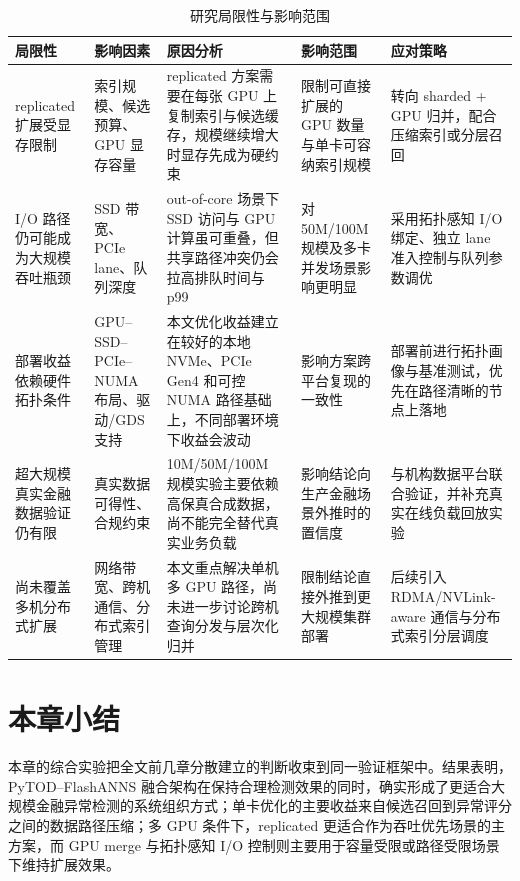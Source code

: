 \begin{table}[htbp]
  \caption{研究局限性与影响范围}
  \label{tab:limitations}
  \centering
  \footnotesize
  \setlength{\tabcolsep}{1.9pt}
  \renewcommand{\arraystretch}{1.18}
  \begin{adjustbox}{max width=\linewidth}
  \begin{tabular}{P{1.9cm}P{2.2cm}P{4.8cm}P{2.3cm}P{3.4cm}}
    \toprule
    局限性 & 影响因素 & 原因分析 & 影响范围 & 应对策略 \\
    \midrule
    replicated 扩展受显存限制 & 索引规模、候选预算、GPU 显存容量 & replicated 方案需要在每张 GPU 上复制索引与候选缓存，规模继续增大时显存先成为硬约束 & 限制可直接扩展的 GPU 数量与单卡可容纳索引规模 & 转向 sharded + GPU 归并，配合压缩索引或分层召回 \\
    I/O 路径仍可能成为大规模吞吐瓶颈 & SSD 带宽、PCIe lane、队列深度 & out-of-core 场景下 SSD 访问与 GPU 计算虽可重叠，但共享路径冲突仍会拉高排队时间与 p99 & 对 50M/100M 规模及多卡并发场景影响更明显 & 采用拓扑感知 I/O 绑定、独立 lane 准入控制与队列参数调优 \\
    部署收益依赖硬件拓扑条件 & GPU--SSD--PCIe--NUMA 布局、驱动/GDS 支持 & 本文优化收益建立在较好的本地 NVMe、PCIe Gen4 和可控 NUMA 路径基础上，不同部署环境下收益会波动 & 影响方案跨平台复现的一致性 & 部署前进行拓扑画像与基准测试，优先在路径清晰的节点上落地 \\
    超大规模真实金融数据验证仍有限 & 真实数据可得性、合规约束 & 10M/50M/100M 规模实验主要依赖高保真合成数据，尚不能完全替代真实业务负载 & 影响结论向生产金融场景外推时的置信度 & 与机构数据平台联合验证，并补充真实在线负载回放实验 \\
    尚未覆盖多机分布式扩展 & 网络带宽、跨机通信、分布式索引管理 & 本文重点解决单机多 GPU 路径，尚未进一步讨论跨机查询分发与层次化归并 & 限制结论直接外推到更大规模集群部署 & 后续引入 RDMA/NVLink-aware 通信与分布式索引分层调度 \\
    \bottomrule
  \end{tabular}
  \end{adjustbox}
\end{table}

\section{本章小结}

本章的综合实验把全文前几章分散建立的判断收束到同一验证框架中。结果表明，PyTOD--FlashANNS 融合架构在保持合理检测效果的同时，确实形成了更适合大规模金融异常检测的系统组织方式；单卡优化的主要收益来自候选召回到异常评分之间的数据路径压缩；多 GPU 条件下，replicated 更适合作为吞吐优先场景的主方案，而 GPU merge 与拓扑感知 I/O 控制则主要用于容量受限或路径受限场景下维持扩展效果。
